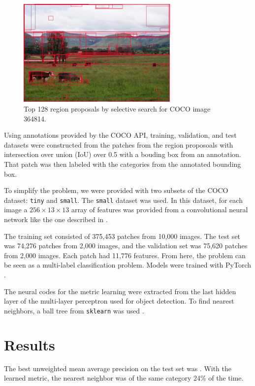 \documentclass[letterpaper]{article}
\begin{document}
\begin{figure}
  \centering
  \includegraphics[width=0.7\textwidth]{../hw3/bounding_box_sample.png}
  \caption{Top 128 region proposals by selective search for COCO image 364814.}
  \label{fig:coco_selective_search}
\end{figure}

Using annotations provided by the COCO API, training, validation, and test
datasets were constructed from the patches from the region proposoals with
intersection over union (IoU) over 0.5 with a bouding box from an
annotation. That patch was then labeled with the categories from the annotated
bounding box.

To simplify the problem, we were provided with two subsets of the COCO dataset:
\texttt{tiny} and \texttt{small}. The \texttt{small} dataset was used. In this
dataset, for each image a $256 \times 13 \times 13$ array of features was
provided from a convolutional neural network like the one described in
\cite{fast_rnn}.

The training set consisted of 375,453 patches from 10,000 images. The test set
was 74,276 patches from 2,000 images, and the validation set was 75,620 patches
from 2,000 images. Each patch had 11,776 features. From here, the problem can be
seen as a multi-label classification problem. Models were trained with PyTorch
\citep{pytorch}.

The neural codes for the metric learning were extracted from the last hidden
layer of the multi-layer perceptron used for object detection. To find nearest
neighbors, a ball tree from \texttt{sklearn} was used \citep{scikit-learn}.

\section{Results}

The best unweighted mean average precision on the test set was
\unskip. With the
learned metric, the nearest neighbor was of the same category 24\% of the
time.
\end{document}
